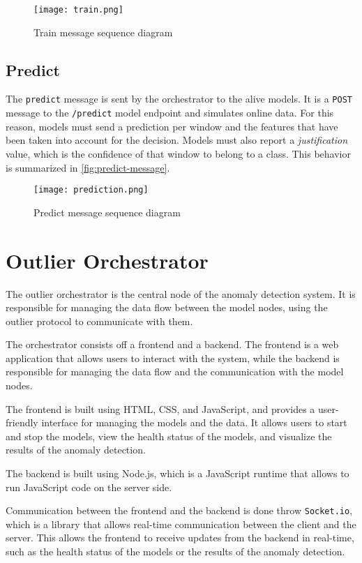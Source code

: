 \begin{figure}[H]
    \centering
    \texttt{[image: train.png]}
    \caption{Train message sequence diagram}
    \label{fig:train-message}
\end{figure}

\subsection{Predict}

The \texttt{predict} message is sent by the orchestrator to the alive models. It is a \texttt{POST} message to the \texttt{/predict} model endpoint and simulates online data. For this reason, models must send a prediction per window and the features that have been taken into account for the decision. Models must also report a \textit{justification} value, which is the confidence of that window to belong to a class. This behavior is summarized in \autoref{fig:predict-message}.

\begin{figure}[H]
    \centering
    \texttt{[image: prediction.png]}
    \caption{Predict message sequence diagram}
    \label{fig:predict-message}
\end{figure}

\section{Outlier Orchestrator}\label{sec:orchestrator}

The outlier orchestrator is the central node of the anomaly detection system. It is responsible for managing the data flow between the model nodes, using the outlier protocol to communicate with them.

The orchestrator consists off a frontend and a backend. The frontend is a web application that allows users to interact with the system, while the backend is responsible for managing the data flow and the communication with the model nodes.

The frontend is built using HTML, CSS, and JavaScript, and provides a user-friendly interface for managing the models and the data. It allows users to start and stop the models, view the health status of the models, and visualize the results of the anomaly detection.

The backend is built using Node.js, which is a JavaScript runtime that allows to run JavaScript code on the server side.

Communication between the frontend and the backend is done throw \texttt{Socket.io}, which is a library that allows real-time communication between the client and the server. This allows the frontend to receive updates from the backend in real-time, such as the health status of the models or the results of the anomaly detection.

